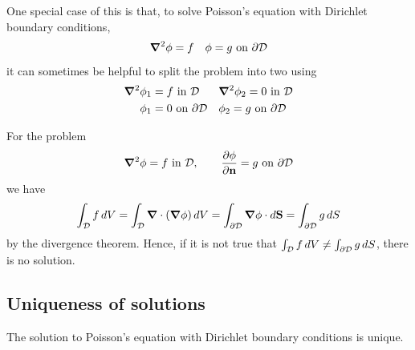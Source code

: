 \documentclass{../../template/note}
\begin{document}
    One special case of this is that, to solve Poisson's equation with Dirichlet boundary conditions,
    \begin{align*}
        \grad^2\phi = f && \phi = g \text{ on } \pr \mc D
    \end{align*}
    it can sometimes be helpful to split the problem into two using
    \begin{align*}
        \grad^2\phi_1 &= f \text{ in } \mc D && \grad^2\phi_2 = 0 \text{ in } \mc D \\
        \phi_1 &= 0 \text{ on } \pr \mc D && \phi_2 = g \text{ on } \pr \mc D
    \end{align*}
    

    \begin{remark*}
        For the problem
        \begin{align*}
            \grad^2 \phi = f \text{ in } \mc D, \qquad \pd{\phi}{\V n} = g \text{ on } \pr \mc D
        \end{align*}
        we have
        \begin{align*}
            \int_{\mc D} f \D V = \int_{\mc D} \div(\grad \phi) \D V = \int_{\pr \mc D} \grad \phi \cdot d\V S = \int_{\pr \mc D} g \D S
        \end{align*}
        by the divergence theorem. Hence, if it is not true that \(\int_{\mathcal{D}} f \,d{V} \neq \int_{\partial \mathcal{D}} g \,d{S}\), there is no solution.       
    \end{remark*}
    
    \subsection{Uniqueness of solutions}

    \begin{proposition*}
        The solution to Poisson's equation with Dirichlet boundary conditions is unique.
    \end{proposition*}
    
\end{document}
